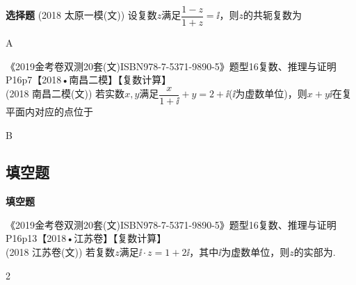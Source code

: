 \begin{exercise}{\bf 选择题}
      {\kaishu (2018 \textbullet 太原一模(文))}
      设复数$z$满足$\dfrac{1-z}{1+z}=\ii$，则$z$的共轭复数为\xz
      \xx{$\ii$}{$-\ii$}{$2\ii$}{$-2\ii$}
      \begin{answer}
        A
      \end{answer}
    \item 《2019金考卷双测20套(文)ISBN978-7-5371-9890-5》题型16复数、推理与证明P16p7【2018•南昌二模】【复数计算】\\
      {\kaishu (2018 \textbullet 南昌二模(文))}
      若实数$x,y$满足$\dfrac{x}{1+\ii}+y=2+\ii$($\ii$为虚数单位)，则$x+y\ii$在复平面内对应的点位于\xz
      \begin{answer}
        B
      \end{answer}
    \end{exercise}
  \subsection{填空题}\begin{exercise}{\bf 填空题}
    \item 《2019金考卷双测20套(文)ISBN978-7-5371-9890-5》题型16复数、推理与证明P16p13【2018•江苏卷】【复数计算】\\
      {\kaishu (2018 \textbullet 江苏卷(文))}
      若复数$z$满足$\ii\cdot z=1+2\ii$，其中$\ii$为虚数单位，则$z$的实部为\tk.
      \begin{answer}
        2
      \end{answer}
    \end{exercise}
